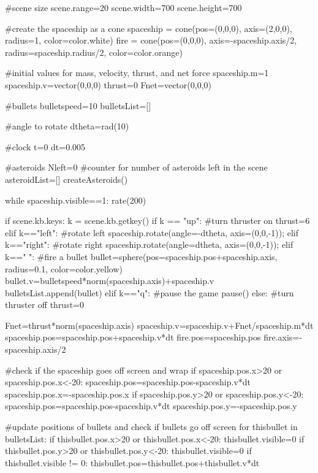 \begin{enumerate}
\begin{vpythonblock}
#scene size
scene.range=20
scene.width=700
scene.height=700

#create the spaceship as a cone
spaceship = cone(pos=(0,0,0), axis=(2,0,0), radius=1, color=color.white)
fire = cone(pos=(0,0,0), axis=-spaceship.axis/2, radius=spaceship.radius/2, color=color.orange)

#initial values for mass, velocity, thrust, and net force
spaceship.m=1
spaceship.v=vector(0,0,0)
thrust=0
Fnet=vector(0,0,0)

#bullets
bulletspeed=10
bulletsList=[]

#angle to rotate
dtheta=rad(10)

#clock
t=0
dt=0.005

#asteroids
Nleft=0 #counter for number of asteroids left in the scene
asteroidList=[]
createAsteroids()

while spaceship.visible==1:
    rate(200)

    if scene.kb.keys:
        k = scene.kb.getkey()
        if k == "up": #turn thruster on
            thrust=6
        elif k=="left": #rotate left
            spaceship.rotate(angle=-dtheta, axis=(0,0,-1));
        elif k=="right": #rotate right
            spaceship.rotate(angle=dtheta, axis=(0,0,-1));
        elif k==" ": #fire a bullet
            bullet=sphere(pos=spaceship.pos+spaceship.axis, radius=0.1, color=color.yellow)
            bullet.v=bulletspeed*norm(spaceship.axis)+spaceship.v
            bulletsList.append(bullet)
        elif k=="q": #pause the game
            pause()
        else: #turn thruster off
            thrust=0

    Fnet=thrust*norm(spaceship.axis)
    spaceship.v=spaceship.v+Fnet/spaceship.m*dt
    spaceship.pos=spaceship.pos+spaceship.v*dt
    fire.pos=spaceship.pos
    fire.axis=-spaceship.axis/2


    #check if the spaceship goes off screen and wrap
    if spaceship.pos.x>20 or spaceship.pos.x<-20:
        spaceship.pos=spaceship.pos-spaceship.v*dt
        spaceship.pos.x=-spaceship.pos.x
    if spaceship.pos.y>20 or spaceship.pos.y<-20:
        spaceship.pos=spaceship.pos-spaceship.v*dt
        spaceship.pos.y=-spaceship.pos.y

    #update positions of bullets and check if bullets go off screen
    for thisbullet in bulletsList:
        if thisbullet.pos.x>20 or thisbullet.pos.x<-20:
            thisbullet.visible=0
        if thisbullet.pos.y>20 or thisbullet.pos.y<-20:
            thisbullet.visible=0
        if thisbullet.visible != 0:
            thisbullet.pos=thisbullet.pos+thisbullet.v*dt


\end{vpythonblock}
\end{enumerate}
